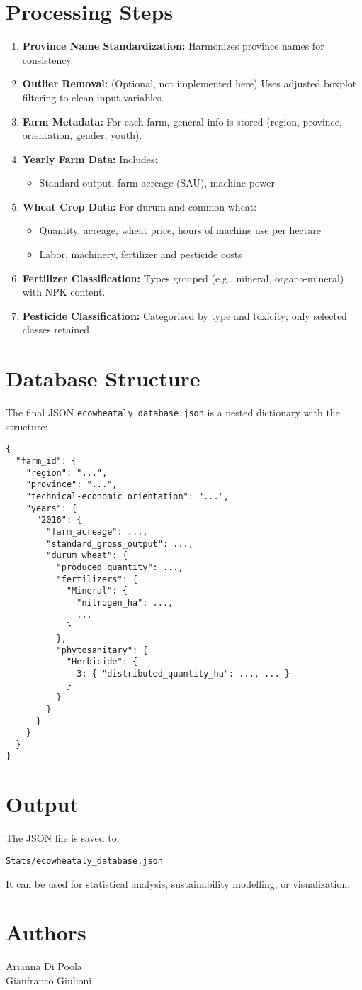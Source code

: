\documentclass[11pt,a4paper]{article}
\begin{document}
\section*{Processing Steps}
\begin{enumerate}
    \item \textbf{Province Name Standardization:} Harmonizes province names for consistency.
    \item \textbf{Outlier Removal:} (Optional, not implemented here) Uses adjusted boxplot filtering to clean input variables.
    \item \textbf{Farm Metadata:} For each farm, general info is stored (region, province, orientation, gender, youth).
    \item \textbf{Yearly Farm Data:} Includes:
    \begin{itemize}
        \item Standard output, farm acreage (SAU), machine power
    \end{itemize}
    \item \textbf{Wheat Crop Data:} For durum and common wheat:
    \begin{itemize}
        \item Quantity, acreage, wheat price, hours of machine use per hectare
        \item Labor, machinery, fertilizer and pesticide costs
    \end{itemize}
    \item \textbf{Fertilizer Classification:} Types grouped (e.g., mineral, organo-mineral) with NPK content.
    \item \textbf{Pesticide Classification:} Categorized by type and toxicity; only selected classes retained.
\end{enumerate}

\section*{Database Structure}
The final JSON \texttt{ecowheataly\_database.json} is a nested dictionary with the structure:

\begin{verbatim}
{
  "farm_id": {
    "region": "...",
    "province": "...",
    "technical-economic_orientation": "...",
    "years": {
      "2016": {
        "farm_acreage": ...,
        "standard_gross_output": ...,
        "durum_wheat": {
          "produced_quantity": ...,
          "fertilizers": {
            "Mineral": {
              "nitrogen_ha": ...,
              ...
            }
          },
          "phytosanitary": {
            "Herbicide": {
              3: { "distributed_quantity_ha": ..., ... }
            }
          }
        }
      }
    }
  }
}
\end{verbatim}

\section*{Output}
The JSON file is saved to:
\begin{verbatim}
Stats/ecowheataly_database.json
\end{verbatim}
It can be used for statistical analysis, sustainability modelling, or visualization.

\section*{Authors}
Arianna Di Poola \\ Gianfranco Giulioni
\end{document}
